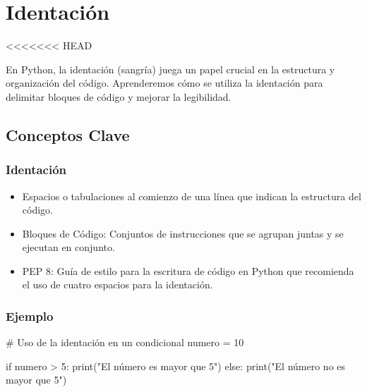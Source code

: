 \documentclass[
  a4paper,
  onepage,
  openany]{scrreprt}
\newenvironment{Shaded}{\begin{snugshade}}{\end{snugshade}}
\newcommand{\BuiltInTok}[1]{\textcolor[rgb]{0.00,0.23,0.31}{#1}}
\newcommand{\CommentTok}[1]{\textcolor[rgb]{0.37,0.37,0.37}{#1}}
\newcommand{\ControlFlowTok}[1]{\textcolor[rgb]{0.00,0.23,0.31}{#1}}
\newcommand{\DecValTok}[1]{\textcolor[rgb]{0.68,0.00,0.00}{#1}}
\newcommand{\NormalTok}[1]{\textcolor[rgb]{0.00,0.23,0.31}{#1}}
\newcommand{\OperatorTok}[1]{\textcolor[rgb]{0.37,0.37,0.37}{#1}}
\newcommand{\StringTok}[1]{\textcolor[rgb]{0.13,0.47,0.30}{#1}}
\providecommand{\tightlist}{%
  \setlength{\itemsep}{0pt}\setlength{\parskip}{0pt}}\usepackage{longtable,booktabs,array}
\begin{document}
\hypertarget{identaciuxf3n}{%
\chapter{Identación}\label{identaciuxf3n}}

\textless\textless\textless\textless\textless\textless\textless{} HEAD

En Python, la identación (sangría) juega un papel crucial en la
estructura y organización del código. Aprenderemos cómo se utiliza la
identación para delimitar bloques de código y mejorar la legibilidad.

\hypertarget{conceptos-clave-6}{%
\section{Conceptos Clave}\label{conceptos-clave-6}}

\hypertarget{identaciuxf3n-1}{%
\subsection{Identación}\label{identaciuxf3n-1}}

\begin{itemize}
\tightlist
\item
  Espacios o tabulaciones al comienzo de una línea que indican la
  estructura del código.
\item
  Bloques de Código: Conjuntos de instrucciones que se agrupan juntas y
  se ejecutan en conjunto.
\item
  PEP 8: Guía de estilo para la escritura de código en Python que
  recomienda el uso de cuatro espacios para la identación.
\end{itemize}

\hypertarget{ejemplo-6}{%
\subsection{Ejemplo}\label{ejemplo-6}}

\begin{Shaded}
\begin{Highlighting}[]
\CommentTok{\# Uso de la identación en un condicional}
\NormalTok{numero }\OperatorTok{=} \DecValTok{10}

\ControlFlowTok{if}\NormalTok{ numero }\OperatorTok{\textgreater{}} \DecValTok{5}\NormalTok{:}
    \BuiltInTok{print}\NormalTok{(}\StringTok{"El número es mayor que 5"}\NormalTok{)}
\ControlFlowTok{else}\NormalTok{:}
    \BuiltInTok{print}\NormalTok{(}\StringTok{"El número no es mayor que 5"}\NormalTok{)}
\end{Highlighting}
\end{Shaded}
\end{document}
